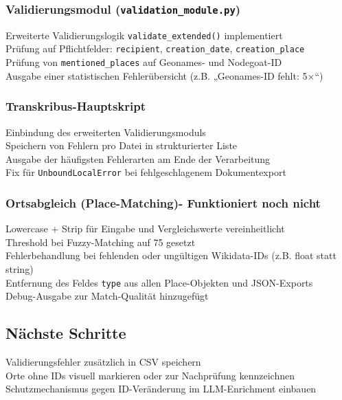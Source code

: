 \documentclass{article}
\begin{document}
\subsubsection*{\small Validierungsmodul (\texttt{validation\_module.py})}
 Erweiterte Validierungslogik \texttt{validate\_extended()} implementiert\\
 Prüfung auf Pflichtfelder: \texttt{recipient}, \texttt{creation\_date}, \texttt{creation\_place}\\
 Prüfung von \texttt{mentioned\_places} auf Geonames- und Nodegoat-ID\\
 Ausgabe einer statistischen Fehlerübersicht (z.B. „Geonames-ID fehlt: 5×“)

\subsubsection*{\small Transkribus-Hauptskript}
 Einbindung des erweiterten Validierungsmoduls\\
 Speichern von Fehlern pro Datei in strukturierter Liste\\
 Ausgabe der häufigsten Fehlerarten am Ende der Verarbeitung\\
 Fix für \texttt{UnboundLocalError} bei fehlgeschlagenem Dokumentexport

\subsubsection*{\small Ortsabgleich (Place-Matching)- Funktioniert noch nicht}
 Lowercase + Strip für Eingabe und Vergleichswerte vereinheitlicht\\
 Threshold bei Fuzzy-Matching auf 75 gesetzt\\
 Fehlerbehandlung bei fehlenden oder ungültigen Wikidata-IDs (z.B. float statt string)\\
 Entfernung des Feldes \texttt{type} aus allen Place-Objekten und JSON-Exports\\
 Debug-Ausgabe zur Match-Qualität hinzugefügt

\subsection*{Nächste Schritte}
 Validierungsfehler zusätzlich in CSV speichern\\
 Orte ohne IDs visuell markieren oder zur Nachprüfung kennzeichnen\\
 Schutzmechanismus gegen ID-Veränderung im LLM-Enrichment einbauen
\end{document}
